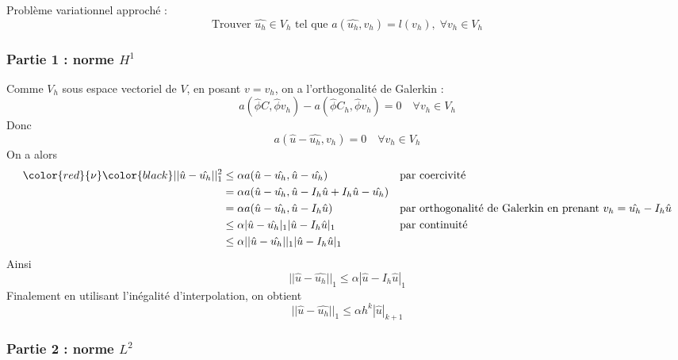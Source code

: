 Problème variationnel approché :
$$\text{Trouver } \hat{u_h}\in V_h \text{ tel que } a(\hat{u_h},v_h)=l(v_h), \;\forall v_h\in V_h$$

\subsubsection{Partie 1 : norme $H^1$}

Comme $V_h$ sous espace vectoriel de $V$, en posant $v=v_h$, on a l'orthogonalité de Galerkin :
$$a(\hat{\phi}C,\hat{\phi}v_h)-a(\hat{\phi}C_h,\hat{\phi}v_h)=0 \quad \forall v_h\in V_h$$
Donc \color{red}{(ATTENTION : Abus de notation sur $v_h$ !)}\color{black}
$$a(\hat{u}-\hat{u_h},v_h)=0 \quad \forall v_h\in V_h$$
On a alors
\begin{align*}
	\color{red}{\nu}\color{black}||\hat{u}-\hat{u_h}||_1^2&\le\alpha a(\hat{u}-\hat{u_h},\hat{u}-\hat{u_h}) &&\text{par coercivité} \\
	&=\alpha a(\hat{u}-\hat{u_h},\hat{u}-I_h\hat{u}+I_h\hat{u}-\hat{u_h}) \\
	&=\alpha a(\hat{u}-\hat{u_h},\hat{u}-I_h\hat{u}) &&\text{par orthogonalité de Galerkin en prenant } v_h=\hat{u_h}-I_h\hat{u} \\
	&\le\alpha |\hat{u}-\hat{u_h}|_1|\hat{u}-I_h\hat{u}|_1 &&\text{par continuité} \\
	&\le\alpha ||\hat{u}-\hat{u_h}||_1|\hat{u}-I_h\hat{u}|_1
\end{align*}
Ainsi
$$||\hat{u}-\hat{u_h}||_1\le\alpha|\hat{u}-I_h\hat{u}|_1$$
Finalement en utilisant l'inégalité d'interpolation, on obtient
\begin{equation}
	\boxed{||\hat{u}-\hat{u_h}||_1\le\alpha h^k|\hat{u}|_{k+1}}
	\label{norme_H1}
\end{equation} 

\subsubsection{Partie 2 : norme $L^2$}

